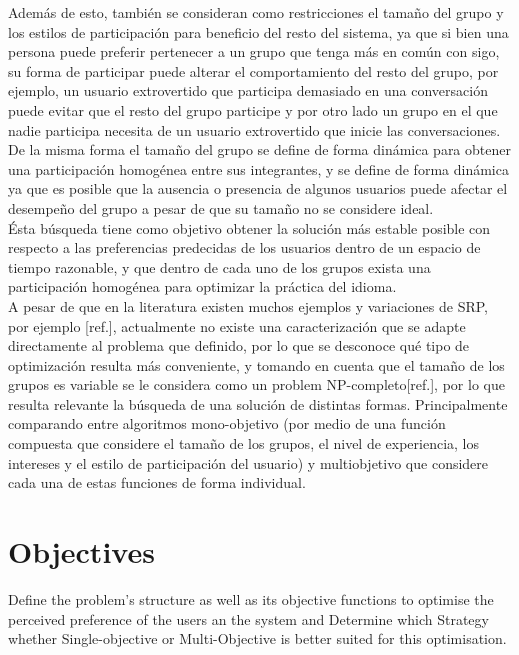 Además de esto, también se consideran como restricciones el tamaño del grupo y los estilos de participación para beneficio del resto del sistema, ya que si bien una persona puede preferir pertenecer a un grupo que tenga más en común con sigo, su forma de participar puede alterar el comportamiento del resto del grupo, por ejemplo, un usuario extrovertido que participa demasiado en una conversación puede evitar que el resto del grupo participe y por otro lado un grupo en el que nadie participa necesita de un usuario extrovertido que inicie las conversaciones.\\ 

De la misma forma el tamaño del grupo se define de forma dinámica para obtener una participación homogénea entre sus integrantes, y se define de forma dinámica ya que es posible que la ausencia o presencia de algunos usuarios puede afectar el desempeño del grupo a pesar de que su tamaño no se considere ideal.\\

Ésta búsqueda tiene como objetivo obtener la solución más estable posible con respecto a las preferencias predecidas de los usuarios dentro de un espacio de tiempo razonable, y que dentro de cada uno de los grupos exista una participación homogénea para optimizar la práctica del idioma.\\

A pesar de que en la literatura existen muchos ejemplos y variaciones de SRP, por ejemplo [ref.], actualmente no existe una caracterización que se adapte directamente al problema que definido, por lo que se desconoce qué tipo de optimización resulta más conveniente, y tomando en cuenta que el tamaño de los grupos es variable se le considera como un problem NP-completo[ref.], por lo que resulta relevante la búsqueda de una solución de distintas formas. Principalmente comparando entre algoritmos mono-objetivo (por medio de una función compuesta que considere el tamaño de los grupos, el nivel de experiencia, los intereses y el estilo de participación del usuario) y multiobjetivo que considere cada una de estas funciones de forma individual.

\section{Objectives}

Define the problem's structure as well as its objective functions to optimise the perceived preference of the users an the system and Determine which Strategy whether Single-objective or Multi-Objective is better suited for this optimisation.\\

